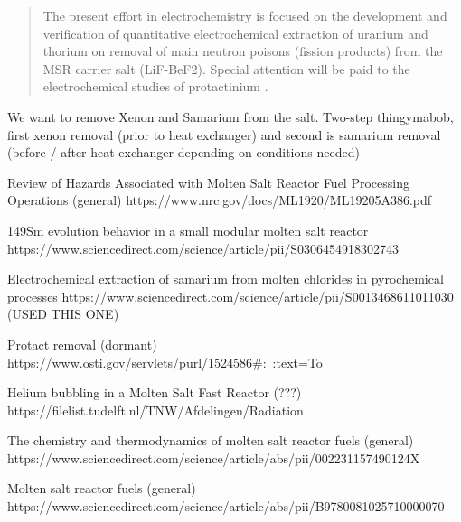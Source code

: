 \documentclass{article}
\begin{document}
\begin{quote}

The present effort in electrochemistry is focused on the
development and verification of quantitative electrochemical extraction of uranium and
thorium on removal of main neutron poisons (fission products) from the MSR carrier salt
(LiF-BeF2). Special attention will be paid to the electrochemical studies of protactinium \cite{ReprocessingReductiveExtraction}.

\end{quote}

We want to remove Xenon and Samarium from the salt. Two-step thingymabob, first xenon removal \cite{XeRemoval} (prior to heat exchanger) and second is samarium removal \cite{SmRemoval} (before / after heat exchanger depending on conditions needed)

Review of Hazards Associated with Molten Salt Reactor Fuel Processing Operations (general)
https://www.nrc.gov/docs/ML1920/ML19205A386.pdf

149Sm evolution behavior in a small modular molten salt reactor
https://www.sciencedirect.com/science/article/pii/S0306454918302743

Electrochemical extraction of samarium from molten chlorides in pyrochemical processes
https://www.sciencedirect.com/science/article/pii/S0013468611011030
(USED THIS ONE)

Protact removal (dormant)
https://www.osti.gov/servlets/purl/1524586#:~:text=To%

Helium bubbling in a Molten Salt Fast Reactor (???)
https://filelist.tudelft.nl/TNW/Afdelingen/Radiation%

The chemistry and thermodynamics of molten salt reactor fuels (general)
https://www.sciencedirect.com/science/article/abs/pii/002231157490124X

Molten salt reactor fuels (general)
https://www.sciencedirect.com/science/article/abs/pii/B9780081025710000070


\printbibliography
\end{document}
